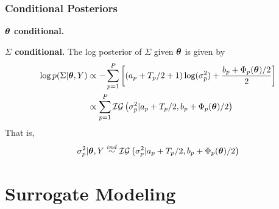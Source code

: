 \documentclass[12pt]{article}
\begin{document}
\subsubsection{Conditional Posteriors}

\bigskip
\noindent
\textbf{$\boldsymbol{\theta}$ conditional.}

\bigskip
\noindent
\textbf{$\Sigma$ conditional.}
The log posterior of $\Sigma$ given $\boldsymbol{\theta}$ is given by 
\begin{align*}
\log p(\Sigma|\boldsymbol{\theta}, Y) &\propto -\sum_{p = 1}^{P} \left[\left(a_p + T_{p}/2 + 1 \right)\log(\sigma_p^2) + \frac{b_p + \Phi_p(\boldsymbol{\theta})/2}{2} \right] \\
				      &\propto \sum_{p = 1}^{P} \mathcal{IG}\left(\sigma_p^2|a_p + T_{p}/2, b_p + \Phi_p(\boldsymbol{\theta})/2 \right)
\end{align*}
That is, 
\begin{align*}
\sigma_p^2|\boldsymbol{\theta}, Y \overset{ind}{\sim} \mathcal{IG}\left(\sigma_p^2|a_p + T_{p}/2, b_p + \Phi_p(\boldsymbol{\theta})/2 \right)
\end{align*}

\section{Surrogate Modeling}
\end{document}
